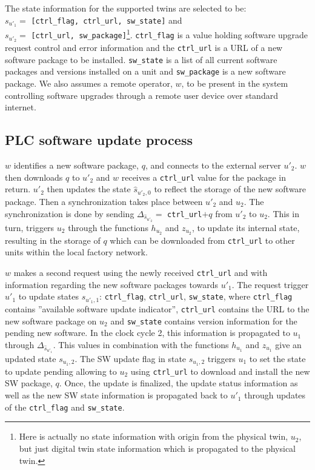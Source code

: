 The state information for the supported twins are selected to be: \\ $s_{u'_1} =$ \texttt{[ctrl\_flag, ctrl\_url, sw\_state]} and  \\ $s_{u'_2} = $ \texttt{[ctrl\_url, sw\_package]}\footnote{Here is actually no state information with origin from the physical twin, $u_2$, but just digital twin state information which is propagated to the physical twin.}.  \texttt{ctrl\_flag} is a value holding software upgrade request control and error information and the \texttt{ctrl\_url} is a URL of a new software package to be installed. \texttt{sw\_state} is a list of all current software packages and versions installed on a unit and \texttt{sw\_package} is a new software package.  We also assumes a remote operator, $w$, to be present in the system controlling software upgrades through a remote user device over standard internet. 


\subsection{PLC software update process}
$w$ identifies a new software package, $q$, and connects to the external server $u'_2$.  $w$ then downloads $q$ to $u'_2$ and $w$  receives a \texttt{ctrl\_url} value for the package in return. $u'_2$ then updates the state $\hat{s}_{u'_2,0}$ to reflect the storage of the new software package. Then a synchronization takes place between $u'_2$ and $u_2$. The synchronization is done by sending $\Delta_{\hat{s}_{u'_2}} = $ \texttt{ctrl\_url}$+ q$ from $u'_2$ to $u_2$. This in turn, triggers $u_2$ through the functions $h_{u_2}$ and $z_{u_2}$, to update its internal state, resulting in the storage of $q$ which can be downloaded from \texttt{ctrl\_url} to other units within the local factory network. 

$w$ makes a second request using the newly received \texttt{ctrl\_url} and with information regarding the new software packages towards $u'_1$. The request trigger $u'_1$ to update states $s_{u'_1,1}$: \texttt{ctrl\_flag}, \texttt{ctrl\_url}, \texttt{sw\_state}, where \texttt{ctrl\_flag} contains ''available software update indicator'', \texttt{ctrl\_url} contains the URL to the new software package on $u_2$ and \texttt{sw\_state} contains version information for the pending new software. In the clock cycle 2, this information is propagated to $u_1$ through  $\Delta_{\hat{s}_{u'_1}}$. This values in combination with the functions $h_{u_1}$ and $z_{u_1}$ give an updated state $s_{u_1,2}$.
The SW update flag in state $s_{u_1,2}$ triggers $u_1$ to set the state to update pending allowing to $u_2$ using \texttt{ctrl\_url} to download and install the new SW package, $q$. Once, the update is finalized, the update status information as well as the new SW state information is propagated back to $u'_1$ through updates of the \texttt{ctrl\_flag} and \texttt{sw\_state}.

